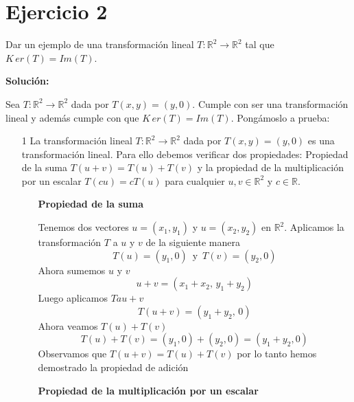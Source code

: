 \section*{Ejercicio 2}

Dar un ejemplo de una transformación lineal $T: \mathbb{R}^{2} \rightarrow \mathbb{R}^{2}$ tal que
$K\,er(T) = Im(T)$.

\noindent \textbf{Solución:}

Sea \(T : \mathbb{R}^2 \rightarrow \mathbb{R}^2\) dada por \(T(x, y) = (y, 0)\). Cumple con ser una transformación lineal y además cumple con que $K\,er(T) = Im(T)$. Pongámoslo a prueba:
\begin{enumerate}
    \item[1] La transformación lineal \(T: \mathbb{R}^2 \to \mathbb{R}^2\) dada por \(T(x, y) = (y, 0)\) es una transformación lineal. Para ello debemos verificar dos propiedades:
    Propiedad de la suma \(T(u + v) = T(u) + T(v)\) y la propiedad de la multiplicación por un escalar 
    \(T(cu) = cT(u)\) para cualquier \(u,v \in \mathbb{R}^2\) y \(c \in \mathbb{R}\).
    
    \begin{itemize}
        \item[] \textbf{Propiedad de la suma}

        Tenemos dos vectores $u = (x_1 , y_1)$ y $u = (x_2 , y_2)$ en $\mathbb{R}^2$. Aplicamos la transformación $T$ a $u$ y $v$ de la siguiente manera
        \begin{equation*}
            T(u) = (y_{1} , 0) \,\,\, \text{y} \,\,\, T(v) = (y_{2} , 0)
        \end{equation*}
        Ahora sumemos $u$ y $v$
        \begin{equation*}
            u  + v = (x_{1} + x_{2},\, y_{1} + y_{2})
        \end{equation*}
        Luego aplicamos $T au + v$
        \begin{equation*}
            T(u  + v) = (y_{1} + y_{2},\, 0)
        \end{equation*}        
        Ahora veamos $T(u) + T(v)$
        \begin{equation*}
            T(u) + T(v) = (y_{1}, 0) + (y_{2}, 0) =  (y_{1}+ y_{2}, 0)
        \end{equation*}        
        Observamos que $T(u+v) = T(u) + T(v)$ por lo tanto hemos demostrado la propiedad de adición


        \item[] \textbf{Propiedad de la multiplicación por un escalar}
        

\end{itemize}
\end{enumerate}
